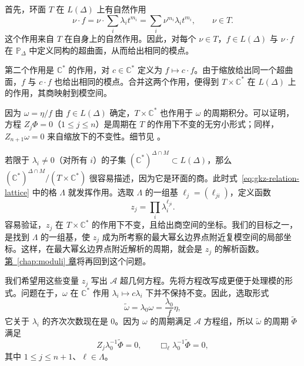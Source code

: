 首先，环面 $T$ 在 $L(\Delta)$ 上有自然作用
\[
\nu\cdot f=\nu\cdot\sum_i\lambda_it^{m_i}
=\sum_i\nu^{m_i}\lambda_it^{m_i},\qquad \nu\in T.
\]
这个作用来自 $T$ 在自身上的自然作用。因此，对每个 $\nu\in T$，$f\in L(\Delta)$ 与 $\nu\cdot f$ 在 $\mathbb P_\Delta$ 中定义同构的超曲面，从而给出相同的模点。

第二个作用是 $\mathbb C^*$ 的作用，对 $c\in\mathbb C^*$ 定义为 $f\mapsto c\cdot f$。由于缩放给出同一个超曲面，$f$ 与 $c\cdot f$ 也给出相同的模点。合并这两个作用，便得到 $T\times\mathbb C^*$ 在 $L(\Delta)$ 上的作用，其商映射到模空间。

因为 $\omega=\eta/f$ 由 $f\in L(\Delta)$ 确定，$T\times\mathbb C^*$ 也作用于 $\omega$ 的周期积分。可以证明，方程 $Z_j\Phi=0$（$1\leq j\leq n$）是周期在 $T$ 的作用下不变的无穷小形式；同样，$Z_{n+1}\omega=0$ 来自缩放下的不变性。细节见 。

若限于 $\lambda_i\ne0$（对所有 $i$）的子集
$(\mathbb C^*)^{\Delta\cap M}\subset L(\Delta)$，那么
$(\mathbb C^*)^{\Delta\cap M}/(T\times\mathbb C^*)$ 很容易描述，因为它是环面的商。此时式~\eqref{eq:gkz-relation-lattice} 中的格 $\Lambda$ 就发挥作用。选取 $\Lambda$ 的一组基 $\ell_j=(\ell_{ji})$，定义函数
\[
z_j=\prod_i\lambda_i^{\ell_{ji}}.
\]
容易验证，$z_j$ 在 $T\times\mathbb C^*$ 的作用下不变，且给出商空间的坐标。我们的目标之一，是找到 $\Lambda$ 的一组基，使 $z_j$ 成为所考察的最大幂幺边界点附近复模空间的局部坐标。这样，在最大幂幺边界点附近解析的周期，就会是 $z_j$ 的解析函数。\hyperref[chap:moduli]{第~\ref*{chap:moduli} 章}将再回到这个问题。

我们希望用这些变量 $z_j$ 写出 $\mathcal A$ 超几何方程。先将方程改写成更便于处理模的形式。问题在于，$\omega$ 在 $\mathbb C^*$ 作用 $\lambda_i\mapsto c\lambda_i$ 下并不保持不变。因此，选取形式
\begin{equation}\label{eq:normalized-toric-period-form}
\widetilde\omega=\lambda_0\omega=\frac{\lambda_0}{f}\eta,
\end{equation}
它关于 $\lambda_i$ 的齐次次数现在是 $0$。因为 $\omega$ 的周期满足 $\mathcal A$ 方程组，所以 $\widetilde\omega$ 的周期 $\widetilde\Phi$ 满足
\[
Z_j\lambda_0^{-1}\widetilde\Phi=0,\qquad
\Box_\ell\lambda_0^{-1}\widetilde\Phi=0,
\]
其中 $1\leq j\leq n+1$、$\ell\in\Lambda$。

